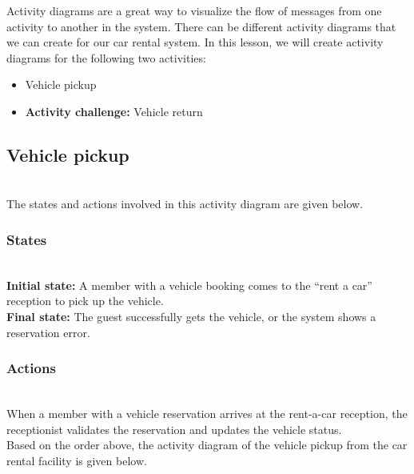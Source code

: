 

Activity diagrams are a great way to visualize the flow of messages from one activity to another in the system. There can be different activity diagrams that we can create for our car rental system. In this lesson, we will create activity diagrams for the following two activities:

\begin{itemize}
\item
\protect{}\label{BeFE21S9WKHbo359Ffo6L}
Vehicle pickup
\item
\protect{}\label{DxWsvVD1rw8-iuBakrQCi}
\textbf{Activity challenge:} Vehicle return
\end{itemize}

\subsection{Vehicle pickup}\label{33y-VE1Cyghis4IlFKTOD}
\\
The states and actions involved in this activity diagram are given below.

\subsubsection{States}\label{RNBCdY5FFIjCJTQtnVvTO}
\\
\textbf{Initial state:} A member with a vehicle booking comes to the ``rent a car'' reception to pick up the vehicle.
\\
\textbf{Final state:} The guest successfully gets the vehicle, or the system shows a reservation error.

\subsubsection{Actions}\label{PtA_QyUFnFsIrLiTIA1M0}
\\
When a member with a vehicle reservation arrives at the rent-a-car reception, the receptionist validates the reservation and updates the vehicle status.
\\
Based on the order above, the activity diagram of the vehicle pickup from the car rental facility is given below.

